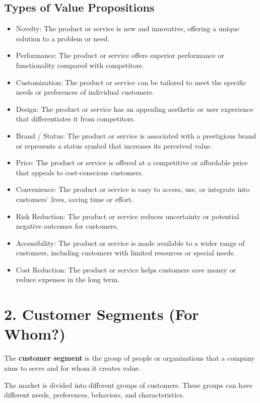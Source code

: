 \documentclass[12pt,a4paper]{report}
\begin{document}
\subsection{Types of Value Propositions}
\begin{itemize}
    \item Novelty: The product or service is new and innovative, offering a unique solution to a problem or need.
    \item Performance: The product or service offers superior performance or functionality compared with competitors.
    \item Customization: The product or service can be tailored to meet the specific needs or preferences of individual customers.
    \item Design: The product or service has an appealing aesthetic or user experience that differentiates it from competitors.
    \item Brand / Status: The product or service is associated with a prestigious brand or represents a status symbol that increases its perceived value.
    \item Price: The product or service is offered at a competitive or affordable price that appeals to cost-conscious customers.   
    \item Convenience: The product or service is easy to access, use, or integrate into customers' lives, saving time or effort.
    \item Risk Reduction: The product or service reduces uncertainty or potential negative outcomes for customers,
    \item Accessibility: The product or service is made available to a wider range of customers, including customers with limited resources or special needs.
    \item Cost Reduction: The product or service helps customers save money or reduce expenses in the long term.
\end{itemize}


\section{2. Customer Segments (For Whom?)}

The \textbf{customer segment} is the group of people or organizations that a company aims to serve and for whom it creates value.

The market is divided into different groups of customers. These groups can have different needs, preferences, behaviors, and characteristics.
\end{document}
